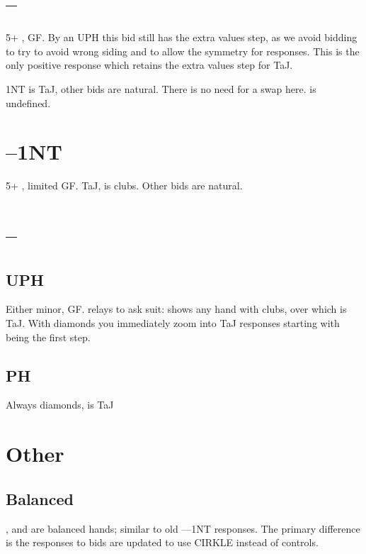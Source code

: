 \documentclass[tom-ari]{subfile}
\begin{document}
	\section[1C--1S]{--}
	
	5+ \heartsuit, GF. By an UPH this bid still has the extra values step, as we avoid bidding  to try to avoid wrong siding and to allow the symmetry for responses. This is the only positive response which retains the extra values step for TaJ.
	
	1NT is TaJ, other bids are natural. There is no need for a swap here.  is undefined.
	
	\section[1C--1NT]{--1NT}
	
	5+ \spadesuit, limited GF.  TaJ,  is clubs. Other bids are natural.
	
	\section[1C--2C]{--}
	
	\subsection{UPH}
	
	Either minor, GF.  relays to ask suit:  shows any hand with clubs, over which  is TaJ. With diamonds you immediately zoom into TaJ responses starting with  being the first step.
	
	\subsection{PH}
	
	Always diamonds,  is TaJ

	\section{Other}
	\subsection{Balanced}	
		,  and  are balanced hands; similar to old ----1NT responses. The primary difference is the responses to bids are updated to use CIRKLE instead of controls. 
	
\end{document}
